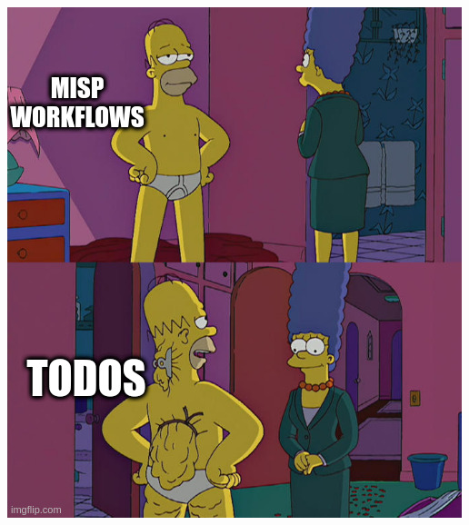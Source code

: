 \begin{frame}
\begin{columns}
\begin{column}{0.45\textwidth}
            \includegraphics[width=1.0\linewidth]{pictures/future-works.jpeg}
        \end{column}
    \end{columns}
\end{frame}

